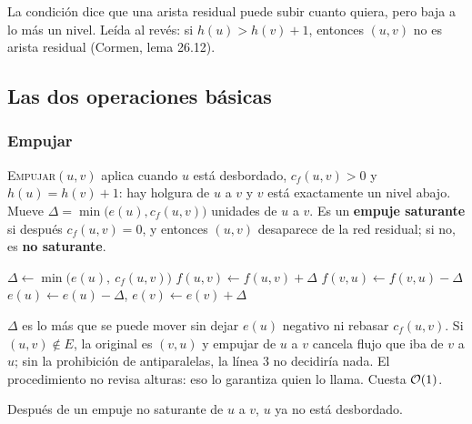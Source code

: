\documentclass[11pt,letterpaper]{article}
\begin{document}
La condición dice que una arista residual puede subir cuanto quiera,
pero baja a lo más un nivel. Leída al revés: si $h(u) > h(v) + 1$,
entonces $(u, v)$ no es arista residual (Cormen, lema 26.12).


\subsection*{Las dos operaciones básicas}

\subsubsection*{Empujar}

\textsc{Empujar}$(u, v)$ aplica cuando $u$ está desbordado,
$c_f(u, v) > 0$ y $h(u) = h(v) + 1$: hay holgura de $u$ a $v$ y $v$
está exactamente un nivel abajo. Mueve
$\Delta = \min\bigl(e(u), c_f(u, v)\bigr)$ unidades de $u$ a $v$. Es
un \textbf{empuje saturante} si después $c_f(u, v) = 0$, y entonces
$(u, v)$ desaparece de la red residual; si no, es \textbf{no
saturante}.

\begin{algorithm}[H]
\caption{\textsc{Empujar}$(u, v)$ \ (\textsc{Push} en Cormen)}
\label{alg:empujar}
\begin{algorithmic}[1]
  \State $\Delta \gets \min\bigl(e(u),\ c_f(u, v)\bigr)$
    \State $f(u, v) \gets f(u, v) + \Delta$ 
  \Else
    \State $f(v, u) \gets f(v, u) - \Delta$ 
  \EndIf
  \State $e(u) \gets e(u) - \Delta$, \quad $e(v) \gets e(v) + \Delta$
\EndProcedure
\end{algorithmic}
\end{algorithm}

$\Delta$ es lo más que se puede mover sin dejar $e(u)$ negativo ni
rebasar $c_f(u, v)$. Si $(u, v) \notin E$, la original es $(v, u)$ y
empujar de $u$ a $v$ cancela flujo que iba de $v$ a $u$; sin la
prohibición de antiparalelas, la línea 3 no decidiría nada. El
procedimiento no revisa alturas: eso lo garantiza quien lo llama.
Cuesta $\mathcal{O}\!\left(1\right)$.

\begin{lema}
  \label{lem:push-no-saturante}
  Después de un empuje no saturante de $u$ a $v$, $u$ ya no está
  desbordado.
\end{lema}
\end{document}
